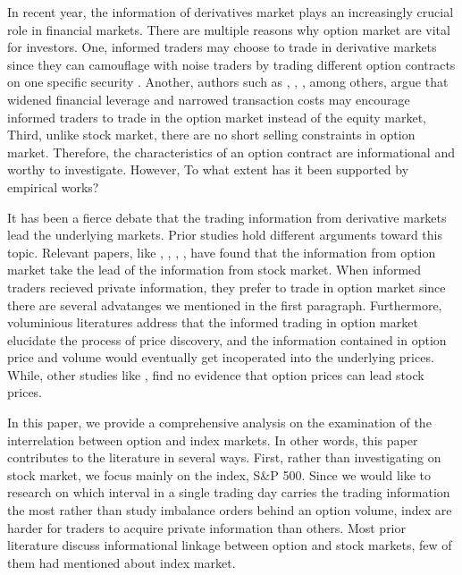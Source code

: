 
In recent year, the information of derivatives market plays an increasingly crucial role in financial markets. There are multiple reasons why option market are vital for investors. One, informed traders may choose to trade in derivative markets since they can camouflage with noise traders by trading different option contracts on one specific security \parencite{easley1998option}. Another, authors such as \textcite{black1973pricing}, \textcite{mayhew1995allocation}, \textcite{fleming1996trading}, among others, argue that widened financial leverage and narrowed transaction costs may encourage informed traders to trade in the option market instead of the equity market,
Third, unlike stock market, there are no short selling constraints in option market. Therefore, the characteristics of an option contract are informational and worthy to investigate. However, To what extent has it been supported by empirical works? 

It has been a fierce debate that the trading information from derivative markets lead the underlying markets. Prior studies hold different arguments toward this topic. Relevant papers, like \textcite{manaster1982option}, \textcite{anthony1988interrelation}, \textcite{chakravarty2004informed}, 
\textcite{cremers2010deviations}, 
\textcite{xing2010does} have found that the information from option market take the lead of the information from stock market. 
When informed traders recieved private information, they prefer to trade in option market since there are several advatanges we mentioned in the first paragraph. Furthermore, voluminious literatures address that the informed trading in option market elucidate the process of price discovery, and the information contained in option price and volume would eventually get incoperated into the underlying prices.
While, other studies like 
\textcite{chan1993option}, 
\textcite{stephan1990intraday} find no evidence that option prices can lead stock prices. 

In this paper, we provide a comprehensive analysis on the examination of the interrelation between option and index markets. In other words, this paper contributes to the literature in several ways. First, rather than investigating on stock market, we focus mainly on the index, S\&P 500. Since we would like to research on which interval in a single trading day carries the trading information the most rather than study imbalance orders behind an option volume, index are harder for traders to acquire private information than others. Most prior literature discuss informational linkage between option and stock markets, few of them had mentioned about index market.   


